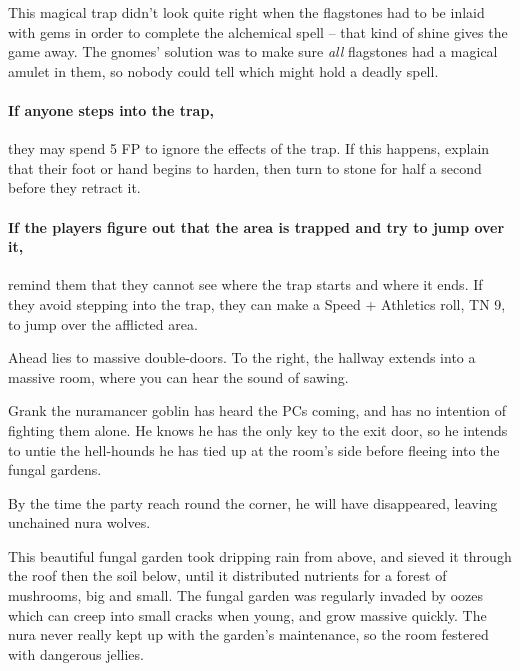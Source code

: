 \begin{multicols}{2}
This magical trap didn't look quite right when the flagstones had to be inlaid with gems in order to complete the alchemical spell -- that kind of shine gives the game away.
The gnomes' solution was to make sure \textit{all} flagstones had a magical amulet in them, so nobody could tell which might hold a deadly spell.

\paragraph{If anyone steps into the trap,}
they may spend 5 FP to ignore the effects of the trap.
If this happens, explain that their foot or hand begins to harden, then turn to stone for half a second before they retract it.

\paragraph{If the players figure out that the area is trapped and try to jump over it,}
remind them that they cannot see where the trap starts and where it ends.
If they avoid stepping into the trap, they can make a Speed + Athletics roll, TN 9, to jump over the afflicted area.


\begin{boxtext}

	Ahead lies to massive double-doors.
	To the right, the hallway extends into a massive room, where you can hear the sound of sawing.

\end{boxtext}

Grank the nuramancer goblin has heard the PCs coming, and has no intention of fighting them alone.
He knows he has the only key to the exit door, so he intends to untie the hell-hounds he has tied up at the room's side before fleeing into the fungal gardens.

By the time the party reach round the corner, he will have disappeared, leaving unchained nura wolves.



\begin{exampletext}

	This beautiful fungal garden took dripping rain from above, and sieved it through the roof then the soil below, until it distributed nutrients for a forest of mushrooms, big and small.
	The fungal garden was regularly invaded by oozes which can creep into small cracks when young, and grow massive quickly.
	The nura never really kept up with the garden's maintenance, so the room festered with dangerous jellies.


\end{exampletext}
\end{multicols}
